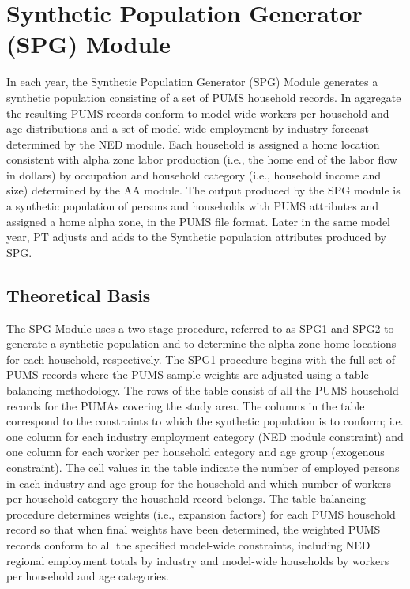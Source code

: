 \chapter{Synthetic Population Generator (SPG) Module}\label{sec:spg-chapter}
In each year, the Synthetic Population Generator (SPG) Module generates a synthetic population consisting of a set of PUMS household records. In aggregate the resulting PUMS records conform to model-wide workers per household and age distributions and a set of model-wide employment by industry forecast determined by the NED module. Each household is assigned a home location consistent with alpha zone labor production (i.e., the home end of the labor flow in dollars) by occupation and household category (i.e., household income and size) determined by the AA module. The output produced by the SPG module is a synthetic population of persons and households with PUMS attributes and assigned a home alpha zone, in the PUMS file format. Later in the same model year, PT adjusts and adds to the Synthetic population attributes produced by SPG.

\section{Theoretical Basis}
The SPG Module uses a two-stage procedure, referred to as SPG1 and SPG2 to generate a synthetic population and to determine the alpha zone home locations for each household, respectively. The SPG1 procedure begins with the full set of PUMS records where the PUMS sample weights are adjusted using a table balancing methodology. The rows of the table consist of all the PUMS household records for the PUMAs covering the study area. The columns in the table correspond to the constraints to which the synthetic population is to conform; i.e. one column for each industry employment category (NED module constraint) and one column for each worker per household category and age group (exogenous constraint). The cell values in the table indicate the number of employed persons in each industry and age group for the household and which number of workers per household category the household record belongs. The table balancing procedure determines weights (i.e., expansion factors) for each PUMS household record so that when final weights have been determined, the weighted PUMS records conform to all the specified model-wide constraints, including NED regional employment totals by industry and model-wide households by workers per household and age categories. 


